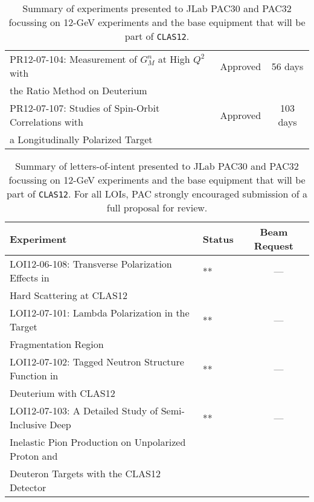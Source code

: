 \begin{table}[htbp]
\begin{center}
\begin{tabular} {||l|l|c|}
PR12-07-104: Measurement of $G^n_M$ at High $Q^2$ with    & Approved      & 56 days  \\
the Ratio Method on Deuterium                             &               &          \\ \hline
PR12-07-107: Studies of Spin-Orbit Correlations with      & Approved      & 103 days \\
a Longitudinally Polarized Target                         &               &          \\ \hline \hline
\end{tabular}
\caption{\small{Summary of experiments presented to JLab PAC30 and PAC32 
focussing on 12-GeV experiments and the base equipment that will be part of 
{\tt CLAS12}.}}
\label{pac_prop}
\end{center}
\end{table}

\begin{table}[htbp]
\begin{center}
\begin{tabular} {||l|l|c|} \hline \hline
Experiment & Status & Beam Request \\ \hline
LOI12-06-108: Transverse Polarization Effects in          & **            & ~~---    \\
Hard Scattering at CLAS12                                 &               &          \\ \hline
LOI12-07-101: Lambda Polarization in the Target           & **            & ~~---    \\
Fragmentation Region                                      &               &          \\ \hline
LOI12-07-102: Tagged Neutron Structure Function in        & **            & ~~---    \\
Deuterium with CLAS12                                     &               &          \\ \hline
LOI12-07-103: A Detailed Study of Semi-Inclusive Deep     & **            & ~~---    \\
Inelastic Pion Production on Unpolarized Proton and       &               &          \\
Deuteron Targets with the CLAS12 Detector                 &               &          \\ \hline \hline
\end{tabular}
\caption{\small{Summary of letters-of-intent presented to JLab PAC30 
and PAC32 focussing on 12-GeV experiments and the base equipment that 
will be part of {\tt CLAS12}.  For all LOIs, PAC strongly encouraged 
submission of a full proposal for review.}}
\label{pac_loi}
\end{center}
\end{table}

